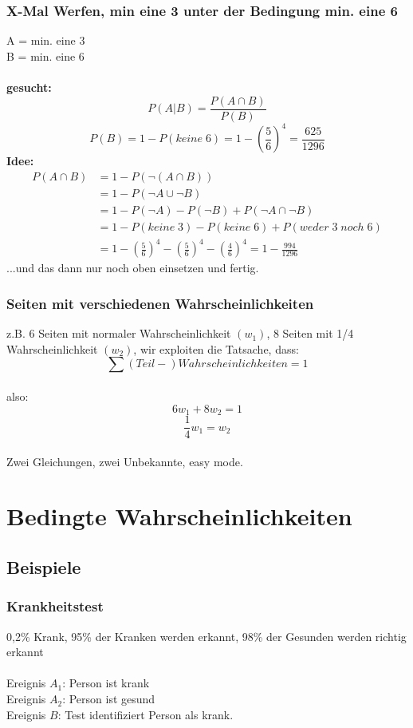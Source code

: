 \documentclass{article}
\begin{document}
\subsubsection{X-Mal Werfen, min eine 3 unter der Bedingung min. eine 6}
A = min. eine 3 \\
B = min. eine 6 \\\\
\textbf{gesucht:} \[P(A|B) = \frac{P(A\cap B)}{P(B)} \]
\[P(B) = 1-P(keine\;6) = 1-\left(\frac{5}{6}\right)^4 = \frac{625}{1296}\]
\textbf{Idee:}
\begin{align*}
	P(A\cap B) 	&= 1-P(\neg (A\cap B))\\
							   &= 1-P(\neg A \cup \neg B)\\
							&= 1-P(\neg A) - P(\neg B) + P(\neg A \cap \neg B)\\
						 &= 1-P(keine\;3)-P(keine\;6)+P(weder\;3\;noch\;6)\\
						 &= 1-\left( \frac{5}{6}\right)^4-\left( \frac{5}{6}\right)^4-\left( \frac{4}{6}\right)^4 = 1- \frac{994}{1296}
\end{align*}	
...und das dann nur noch oben einsetzen und fertig.

\subsubsection{Seiten mit verschiedenen Wahrscheinlichkeiten}
z.B. 6 Seiten mit normaler Wahrscheinlichkeit $(w_1)$, 8 Seiten mit 1/4 Wahrscheinlichkeit
$(w_2)$, wir exploiten die Tatsache, dass: \\ \[ \sum
(Teil-)Wahrscheinlichkeiten = 1 \]\\
also:\\
\begin{equation}	
6w_1 + 8w_2 = 1 \end{equation}
\begin{equation}	
	\frac{1}{4}w_1 = w_2 
\end{equation}\\
Zwei Gleichungen, zwei Unbekannte, easy mode.

\section{Bedingte Wahrscheinlichkeiten}
\subsection{Beispiele}
\subsubsection{Krankheitstest}
0,2\% Krank, 95\% der Kranken werden erkannt, 98\% der Gesunden werden richtig erkannt\\ \\
Ereignis $A_1$: Person ist krank\\
Ereignis $A_2$: Person ist gesund\\
Ereignis $B$: Test identifiziert Person als krank.\\
\end{document}

